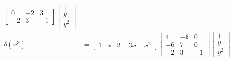 \documentclass{standalone}
\begin{document}
\begin{rem}
\begin{align}
\begin{bmatrix}
		0 & -2 & 3 \\
		-2 & 3 & -1
	\end{bmatrix}
	\begin{bmatrix}
		1 \\
		y \\
		y^2
	\end{bmatrix} \\ \nonumber %
	\delta(x^3) &=
	\begin{bmatrix}
			1 & x & 2 - 3x + x^2
	\end{bmatrix}
	\begin{bmatrix}
		4 & -6 & 0 \\
		-6 & 7 & 0 \\
		-2 & 3 & -1
	\end{bmatrix}
	\begin{bmatrix}
		1 \\
		y \\
		y^2
	\end{bmatrix} \\ \nonumber %
\end{align}



\end{rem}
\end{document}
